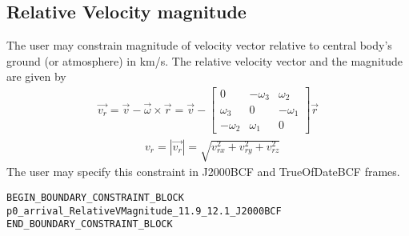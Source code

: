\documentclass[11pt]{article}
\begin{document}
\subsection{Relative Velocity magnitude}
\label{subsec:relativevelocity_magnitude}
The user may constrain magnitude of velocity vector relative to central body's ground (or atmosphere) in km/s. The relative velocity vector and the magnitude are given by
\begin{equation}
	\label{eq:rel_velocity}
	\begin{aligned}
		\vec{v_r} = \vec{v} - \vec{\omega} \times \vec{r} = \vec{v} -
		\begin{bmatrix}
		0 & -\omega_3 & \omega_2 \\
		\omega_3 & 0 & -\omega_1 \\
		-\omega_2 & \omega_1 & 0
		\end{bmatrix}
		\vec{r}
	\end{aligned}
\end{equation}
\begin{equation}
	\label{eq:rel_velocity_magnitude}
	\begin{aligned}
		&v_r = \left|\vec{v_r}\right| = \sqrt{v_{rx}^{2}+v_{ry}^{2}+v_{rz}^{2}}
	\end{aligned}
\end{equation}
The user may specify this constraint in J2000BCF and TrueOfDateBCF frames.

\begin{verbatim}
BEGIN_BOUNDARY_CONSTRAINT_BLOCK
p0_arrival_RelativeVMagnitude_11.9_12.1_J2000BCF
END_BOUNDARY_CONSTRAINT_BLOCK
\end{verbatim}
\end{document}
